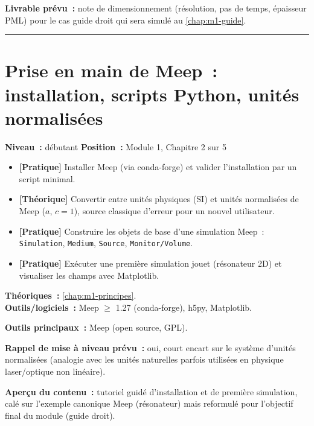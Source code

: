 \noindent\textbf{Livrable prévu~:} note de dimensionnement (résolution, pas de temps, épaisseur PML) pour le cas guide droit qui sera simulé au \cref{chap:m1-guide}.

\bigskip\hrule\bigskip

\chapter{Prise en main de Meep~: installation, scripts Python, unités normalisées}
\label{chap:m1-meep}

\noindent\textbf{Niveau~:} débutant \hfill \textbf{Position~:} Module 1, Chapitre 2 sur 5

\begin{objectifs}
\begin{itemize}[leftmargin=1.4em]
  \item \textbf{[Pratique]} Installer Meep (via conda-forge) et valider l'installation par un script minimal.
  \item \textbf{[Théorique]} Convertir entre unités physiques (SI) et unités normalisées de Meep ($a$, $c=1$), source classique d'erreur pour un nouvel utilisateur.
  \item \textbf{[Pratique]} Construire les objets de base d'une simulation Meep~: \texttt{Simulation}, \texttt{Medium}, \texttt{Source}, \texttt{Monitor/Volume}.
  \item \textbf{[Pratique]} Exécuter une première simulation \og jouet\fg{} (résonateur 2D) et visualiser les champs avec Matplotlib.
\end{itemize}
\end{objectifs}

\begin{prerequis}
\textbf{Théoriques~:} \cref{chap:m1-principes}.\\
\textbf{Outils/logiciels~:} Meep $\geq$ 1.27 (conda-forge), h5py, Matplotlib.
\end{prerequis}

\noindent\textbf{Outils principaux~:} Meep (open source, GPL).

\noindent\textbf{Rappel de mise à niveau prévu~:} oui, court encart sur le système d'unités normalisées (analogie avec les unités \og naturelles\fg{} parfois utilisées en physique laser/optique non linéaire).

\noindent\textbf{Aperçu du contenu~:} tutoriel guidé d'installation et de première simulation, calé sur l'exemple canonique Meep (résonateur) mais reformulé pour l'objectif final du module (guide droit).

